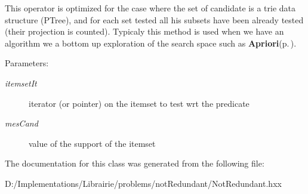 This operator is optimized for the case where the set of candidate is a trie data structure (PTree), and for each set tested all his subsets have been already tested (their projection is counted). Typicaly this method is used when we have an algorithm we a bottom up exploration of the search space such as {\bf Apriori}{\rm (p.\,\pageref{class_apriori})}.

\begin{Desc}
\item[Parameters:]
\begin{description}
\item[{\em itemset\-It}]iterator (or pointer) on the itemset to test wrt the predicate \item[{\em mes\-Cand}]value of the support of the itemset \end{description}
\end{Desc}


The documentation for this class was generated from the following file:\begin{CompactItemize}
\item 
D:/Implementations/Librairie/problems/not\-Redundant/Not\-Redundant.hxx\end{CompactItemize}
